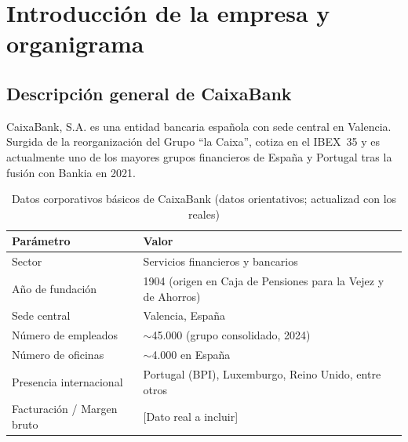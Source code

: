 %

\section{Introducción de la empresa y organigrama}

\subsection{Descripción general de CaixaBank}


CaixaBank, S.A. es una entidad bancaria española con sede central en Valencia.
Surgida de la reorganización del Grupo ``la Caixa'', cotiza en el IBEX~35 y es
actualmente uno de los mayores grupos financieros de España y Portugal tras la
fusión con Bankia en 2021.

\begin{table}[H]
  \centering
  \caption{Datos corporativos básicos de CaixaBank (datos orientativos; actualizad con los reales)}
  \begin{tabularx}{\textwidth}{lX}
    \toprule
    \textbf{Parámetro}           & \textbf{Valor} \\
    \midrule
    Sector                       & Servicios financieros y bancarios \\
    Año de fundación             & 1904 (origen en Caja de Pensiones para la Vejez y de Ahorros) \\
    Sede central                 & Valencia, España \\
    Número de empleados          & $\sim$45.000 (grupo consolidado, 2024) \\
    Número de oficinas           & $\sim$4.000 en España \\
    Presencia internacional      & Portugal (BPI), Luxemburgo, Reino Unido, entre otros \\
    Facturación / Margen bruto   & [Dato real a incluir] \\
    \bottomrule
  \end{tabularx}
\end{table}

